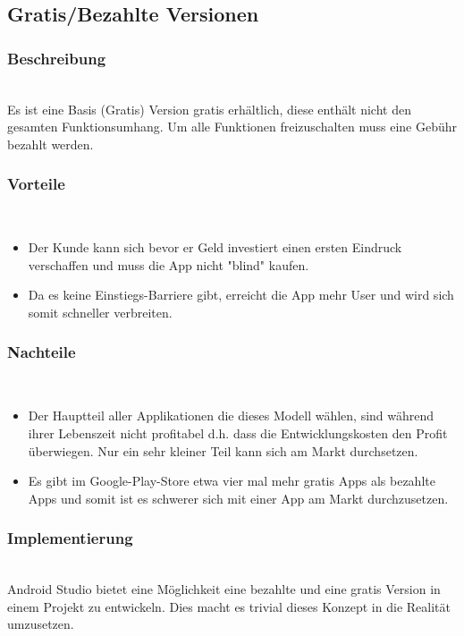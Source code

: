 \documentclass[FIPLY_base.tex]{subfiles}
\begin{document}
\subsection{Gratis/Bezahlte Versionen}


\subsubsection{Beschreibung}\ \\
Es ist eine Basis (Gratis) Version gratis erhältlich, diese enthält nicht den gesamten Funktionsumhang.
Um alle Funktionen freizuschalten muss eine Gebühr bezahlt werden.

\subsubsection{Vorteile}\ \\
\begin{itemize}
\item Der Kunde kann sich bevor er Geld investiert einen ersten Eindruck verschaffen und muss die App nicht "blind" kaufen.
\item Da es keine Einstiegs-Barriere gibt, erreicht die App mehr User und wird sich somit schneller verbreiten.
\end{itemize}

\subsubsection{Nachteile}\ \\
\begin{itemize}
\item Der Hauptteil aller Applikationen die dieses Modell wählen, sind während ihrer Lebenszeit nicht profitabel d.h. dass die Entwicklungskosten den Profit überwiegen. Nur ein sehr kleiner Teil kann sich am Markt durchsetzen.
\item Es gibt im Google-Play-Store etwa vier mal mehr gratis Apps als bezahlte Apps und somit ist es schwerer sich mit einer App am Markt durchzusetzen.
\end{itemize}

\subsubsection{Implementierung}\ \\

Android Studio bietet eine Möglichkeit eine bezahlte und eine gratis Version in einem Projekt zu entwickeln.
Dies macht es trivial dieses Konzept in die Realität umzusetzen.
\end{document}
